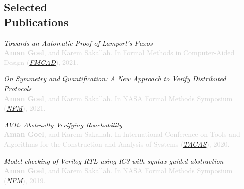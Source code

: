 \documentclass[line,margin,letter]{resume}
\begin{document}
\begin{resume}
\section{\mysidestyle Selected\\Publications \\ 
\href{https://scholar.google.com/citations?user=iFCl5vEAAAAJ&hl=en&oi=sra}{\faGraduationCap}}



\hspace{-2em}
\hspace{0.3em}
\textit{Towards an Automatic Proof of Lamport's Paxos} \\
\textcolor{lightgray}{\textbf{Aman Goel}, and Karem Sakallah. In Formal Methods in Computer-Aided Design (\href{https://fmcad.org/FMCAD21/}{\textit{FMCAD}}), 2021.}

\hspace{-3.8em} \href{https://youtu.be/e0pr3P2BrEU}{\faYoutubePlay} \hspace{0.1em} \href{https://link.springer.com/chapter/10.1007/978-3-030-76384-8_9}{\faFilePdfO} \hspace{0.3em}
\textit{On Symmetry and Quantification: A New Approach to Verify Distributed Protocols} \\
\textcolor{lightgray}{\textbf{Aman Goel}, and Karem Sakallah. In NASA Formal Methods Symposium (\href{https://shemesh.larc.nasa.gov/nfm2021/}{\textit{NFM}}), 2021.}

\hspace{-2em} \href{https://link.springer.com/chapter/10.1007%2F978-3-030-45190-5_23}{\faFilePdfO} \hspace{0.3em}
\textit{AVR: Abstractly Verifying Reachability} \\
\textcolor{lightgray}{\textbf{Aman Goel}, and Karem Sakallah. In International Conference on Tools and Algorithms for the Construction and Analysis of Systems (\href{https://www.etaps.org/2020/tacas}{\textit{TACAS}}), 2020.}

\hspace{-2em} \href{https://link.springer.com/chapter/10.1007/978-3-030-20652-9_11}{\faFilePdfO} \hspace{0.3em}
\textit{Model checking of Verilog RTL using IC3 with syntax-guided abstraction} \\
\textcolor{lightgray}{\textbf{Aman Goel}, and Karem Sakallah. In NASA Formal Methods Symposium (\href{https://robonaut.jsc.nasa.gov/R2/pages/nfm2019.html}{\textit{NFM}}), 2019.}


\end{resume}
\end{document}
